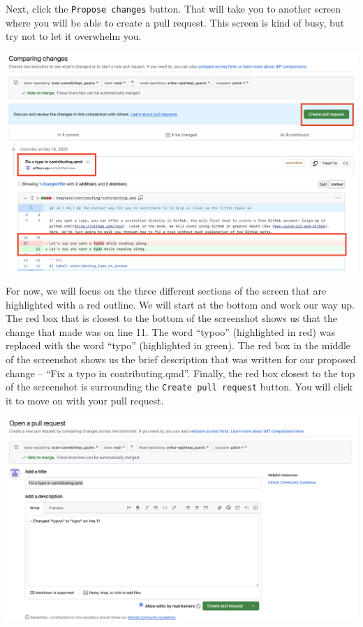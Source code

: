 \documentclass[
  letterpaper,
  DIV=11,
  numbers=noendperiod]{scrreprt}
\begin{document}
Next, click the \texttt{Propose\ changes} button. That will take you to
another screen where you will be able to create a pull request. This
screen is kind of busy, but try not to let it overwhelm you.

\includegraphics{chapters/contributing/create_pull_request_1.png}

For now, we will focus on the three different sections of the screen
that are highlighted with a red outline. We will start at the bottom and
work our way up. The red box that is closest to the bottom of the
screenshot shows us that the change that made was on line 11. The word
``typoo'' (highlighted in red) was replaced with the word ``typo''
(highlighted in green). The red box in the middle of the screenshot
shows us the brief description that was written for our proposed change
-- ``Fix a typo in contributing.qmd''. Finally, the red box closest to
the top of the screenshot is surrounding the
\texttt{Create\ pull\ request} button. You will click it to move on with
your pull request.

\includegraphics{chapters/contributing/create_pull_request_2.png}
\end{document}

